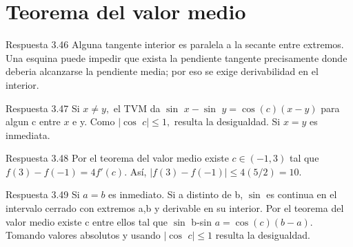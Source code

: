 \documentclass[10pt,a4paper,oneside,openany]{book}
\begin{document}
\section{Teorema del valor medio}
\begin{PSevenAnswerFixed}{Respuesta 3.46}
Alguna tangente interior es paralela a la secante entre extremos. Una esquina puede impedir que exista la pendiente tangente precisamente donde deberia alcanzarse la pendiente media; por eso se exige derivabilidad en el interior.
\end{PSevenAnswerFixed}
\begin{PSevenAnswerFixed}{Respuesta 3.47}
Si \(x\ne y,\) el TVM da \(\sin\) \(x-\sin\) \(y=\cos(c)(x-y)\) para algun c entre \(x\) e y. Como \(|\cos\) \(c|\le 1,\) resulta la desigualdad. Si \(x=y\) es inmediata.
\end{PSevenAnswerFixed}
\begin{PSevenAnswerFixed}{Respuesta 3.48}
Por el teorema del valor medio existe \(c\in(-1,3)\) tal que \(f(3)-f(-1)=4f'(c)\). Así, \(|f(3)-f(-1)|\le4(5/2)=10\).
\end{PSevenAnswerFixed}
\begin{PSevenAnswerFixed}{Respuesta 3.49}
Si \(a=b\) es inmediato. Si a distinto de b, \(\sin\) es continua en el intervalo cerrado con extremos a,b y derivable en su interior. Por el teorema del valor medio existe c entre ellos tal que \(\sin\) b-sin \(a=\cos(c)(b-a)\). Tomando valores absolutos y usando \(|\cos\) \(c|\le 1\) resulta la desigualdad.
\end{PSevenAnswerFixed}
\end{document}
